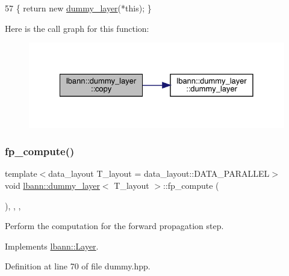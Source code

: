 \begin{DoxyCode}
57 \{ \textcolor{keywordflow}{return} \textcolor{keyword}{new} \hyperlink{classlbann_1_1dummy__layer_aed5bc546171348eaaf91aaf196406440}{dummy\_layer}(*\textcolor{keyword}{this}); \}
\end{DoxyCode}
Here is the call graph for this function\+:\nopagebreak
\begin{figure}[H]
\begin{center}
\leavevmode
\includegraphics[width=328pt]{classlbann_1_1dummy__layer_a673315d873a571bd4b3cacfeffff329c_cgraph}
\end{center}
\end{figure}
\mbox{\label{classlbann_1_1dummy__layer_a4d59be5e984ebd1d6d16d17bb26f3486}} 
\subsubsection{\texorpdfstring{fp\+\_\+compute()}{fp\_compute()}}
{\footnotesize\ttfamily template$<$data\+\_\+layout T\+\_\+layout = data\+\_\+layout\+::\+D\+A\+T\+A\+\_\+\+P\+A\+R\+A\+L\+L\+EL$>$ \\
void \hyperlink{classlbann_1_1dummy__layer}{lbann\+::dummy\+\_\+layer}$<$ T\+\_\+layout $>$\+::fp\+\_\+compute (\begin{DoxyParamCaption}{ }\end{DoxyParamCaption})\hspace{0.3cm}{\ttfamily [inline]}, {\ttfamily [override]}, {\ttfamily [protected]}, {\ttfamily [virtual]}}

Perform the computation for the forward propagation step. 

Implements \hyperlink{classlbann_1_1Layer_a523319dd1bd87a0612afa1912bb5aad7}{lbann\+::\+Layer}.



Definition at line 70 of file dummy.\+hpp.


